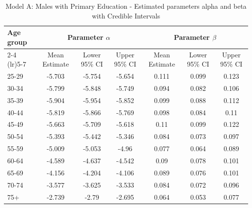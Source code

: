 \begin{landscape}
\begin{table}[htbp]
\centering
\caption{Model A: Males with Primary Education - Estimated parameters alpha and beta  with Credible Intervals}
\label{tab:parameters_ab6}
\begin{tabular}{@{}lcccccc@{}}
\toprule
Age group & \multicolumn{3}{c}{Parameter \(\alpha\)} & \multicolumn{3}{c}{Parameter \(\beta\)} \\ 
\cmidrule(lr){2-4} \cmidrule(lr){5-7}
          & Mean Estimate & Lower 95\% CI & Upper 95\% CI & Mean Estimate & Lower 95\% CI & Upper 95\% CI \\ 
\midrule
25-29 & -5.703 & -5.754 & -5.654 & 0.111 & 0.099 & 0.123 \\
30-34 & -5.799 & -5.848 & -5.749 & 0.094 & 0.082 & 0.106 \\
35-39 & -5.904 & -5.954 & -5.852 & 0.099 & 0.088 & 0.112 \\
40-44 & -5.819 & -5.866 & -5.769 & 0.098 & 0.084 & 0.11 \\
45-49 & -5.663 & -5.709 & -5.618 & 0.11 & 0.099 & 0.122 \\
50-54 & -5.393 & -5.442 & -5.346 & 0.084 & 0.073 & 0.097 \\
55-59 & -5.009 & -5.053 & -4.96 & 0.077 & 0.064 & 0.089 \\
60-64 & -4.589 & -4.637 & -4.542 & 0.09 & 0.078 & 0.101 \\
65-69 & -4.156 & -4.204 & -4.106 & 0.089 & 0.076 & 0.101 \\
70-74 & -3.577 & -3.625 & -3.533 & 0.084 & 0.072 & 0.096 \\
75+ & -2.739 & -2.79 & -2.695 & 0.064 & 0.053 & 0.077 \\
\bottomrule
\end{tabular}
\end{table}
\end{landscape}